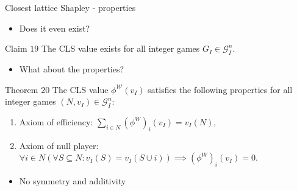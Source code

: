 \documentclass{beamer}
\begin{document}
\begin{frame}{Closest lattice Shapley - properties}

    \begin{itemize}
        \item Does it even exist?
    \end{itemize}


    \begin{block}{Claim $19$}
        The CLS value exists for all integer games $G_I \in \mathcal{G}_I^n$.
    \end{block}


    \begin{itemize}
        \item What about the properties?
    \end{itemize}


    \begin{block}{Theorem $20$}
        The CLS value $\phi^\mathcal{W}(v_I)$ satisfies the following properties for all integer games $(N,v_I) \in \mathcal{G}_I^n$:
        
        \begin{enumerate}
            \item Axiom of efficiency: $\sum_{i \in N}(\phi^W)_{i}(v_I) = v_I(N)$,
            \item Axiom of null player: $\forall i \in N(\forall S \subseteq N: v_I(S)=v_I(S \cup i)) \implies (\phi^W)_{i}(v_I) = 0$.
        \end{enumerate}
    \end{block}


    \begin{itemize}
        \item No symmetry and additivity
    \end{itemize}
\end{frame}


\end{document}
